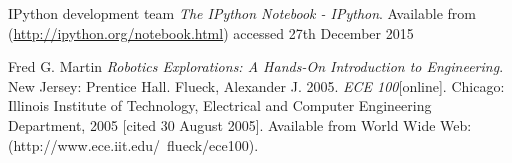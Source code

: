 \documentclass[a4paper, 11pt]{article}
\begin{document}
\begin{thebibliography}{9}

   IPython development team \emph{The IPython Notebook -
  IPython}. Available from
  (\href{http://ipython.org/notebook.html}{http://ipython.org/notebook.html})
  accessed 27th December 2015

\ifx
   Fred G. Martin \emph{Robotics Explorations: A Hands-On Introduction to Engineering}. New Jersey: Prentice Hall.
    Flueck, Alexander J. 2005. \emph{ECE 100}[online]. Chicago: Illinois Institute of Technology, Electrical and Computer Engineering Department, 2005 [cited 30
  August 2005]. Available from World Wide Web: (http://www.ece.iit.edu/~flueck/ece100).
\fi

\end{thebibliography}
\end{document}
